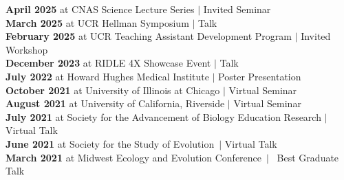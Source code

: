 \documentclass[]{article}
\begin{document}
\textbf{April 2025} at CNAS Science Lecture Series $\vert$ Invited Seminar \hspace{0.3mm} \href{https://ledelaney.org/talks/2025sls/}{\faImages} \href{https://github.com/ledelaney/04-25-SLS}{\faGithub}\\
\textbf{March 2025} at UCR Hellman Symposium $\vert$ Talk \href{https://academicpersonnel.ucr.edu/past-ucr-hellman-fellows}{\faLink}\\
\textbf{February 2025} at UCR Teaching Assistant Development Program $\vert$ Invited Workshop\\
\textbf{December 2023} at RIDLE 4X Showcase Event $\vert$ Talk \hspace{0.3mm} \href{https://ledelaney.org/talks/2023ridle/}{\faImages} \href{https://github.com/ledelaney/12-23-RIDLE}{\faGithub}\\
\textbf{July 2022} at Howard Hughes Medical Institute $\vert$ Poster Presentation \hspace{0.3mm} \href{https://ledelaney.org/talks/2022dtr/}{\faImages} \href{https://github.com/ledelaney/07-22-DTR}{\faGithub}\\
\textbf{October 2021} at University of Illinois at Chicago $\vert$ Virtual Seminar \hspace{0.3mm} \href{https://ledelaney.org/talks/2021defense}{\faImages} \href{https://github.com/ledelaney/10-21-Defense}{\faGithub}\\
\textbf{August 2021} at University of California, Riverside $\vert$ Virtual Seminar \hspace{0.3mm} \href{https://ledelaney.org/talks/2021ucr}{\faImages} \href{https://github.com/ledelaney/08-21-UCR}{\faGithub}\\
\textbf{July 2021} at Society for the Advancement of Biology Education Research $\vert$ Virtual Talk \hspace{0.3mm} \href{https://ledelaney.org/talks/2021saber}{\faImages} \href{https://github.com/ledelaney/07-21-SABER}{\faGithub}\\
\textbf{June 2021} at Society for the Study of Evolution\ $\vert$ Virtual Talk \hspace{0.3mm} \href{https://ledelaney.org/talks/2021evolution}{\faImages} \href{https://github.com/ledelaney/06-21-Evolution}{\faGithub}\\
\textbf{March 2021} at Midwest Ecology and Evolution Conference\ $\vert$ \faAward\ Best Graduate Talk\ \hspace{0.1mm} \href{https://ledelaney.org/talks/2021meec/}{\faImages} \href{https://github.com/ledelaney/03-21-MEEC}{\faGithub}\\
\end{document}
